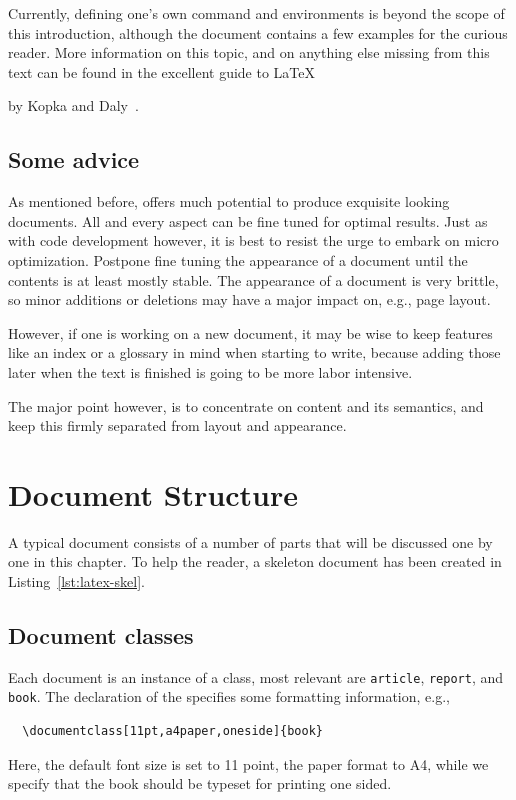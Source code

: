 \documentclass[11pt,a4paper,oneside]{book}
\begin{document}
Currently, defining one's own command and environments is beyond the scope of this introduction, although the document contains a few examples for the curious reader.  More information on this topic, and on anything else missing from this text can be found in the excellent guide to \LaTeX{ by Kopka and Daly~\cite{Kopk04}.


\section{Some advice}
\label{sec:advice}

As mentioned before, \LaTeXe{} offers much potential to produce exquisite looking documents.  All and every aspect can be fine tuned for optimal results.  Just as with code development however, it is best to resist the urge to embark on micro optimization.  Postpone fine tuning the appearance of a document until the contents is at least mostly stable.  The appearance of a document is very brittle, so minor additions or deletions may have a major impact on, e.g., page layout.

However, if one is working on a new document, it may be wise to keep features like an index or a glossary in mind when starting to write, because adding those later when the text is finished is going to be more labor intensive.

The major point however, is to concentrate on content and its semantics, and keep this firmly separated from layout and appearance.


\chapter{Document Structure}
\label{ch:doc-struct}

A typical \LaTeXe{} document consists of a number of parts that will be discussed one by one in this chapter.  To help the reader, a skeleton document has been created in Listing~\ref{lst:latex-skel}.

\section{Document classes}
\label{sec:doc-classes}

Each \LaTeXe{} document is an instance of a class, most relevant are \verb|article|, \verb|report|, and \verb|book|.  The declaration of the  specifies some formatting information, e.g.,
\begin{verbatim}
  \documentclass[11pt,a4paper,oneside]{book}
\end{verbatim}
Here, the default font size is set to 11 point, the paper format to A4, while we specify that the book should be typeset for printing one sided.

}
\end{document}
